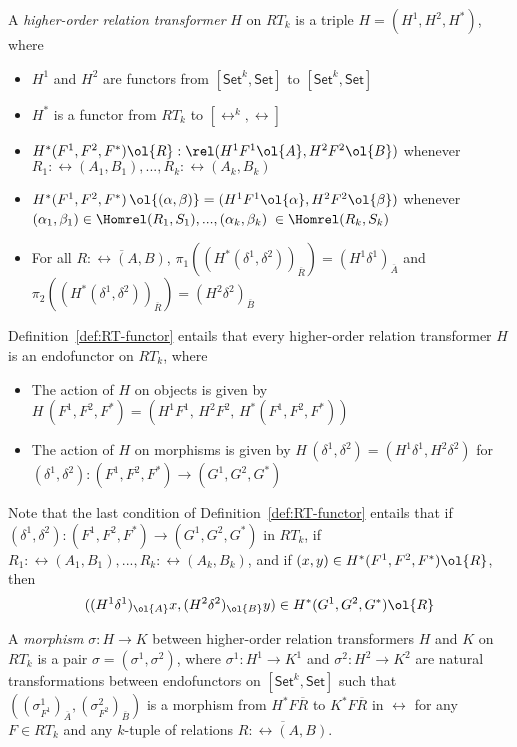 \documentclass{lmcs}
\theoremstyle{plain}\newtheorem{satz}[thm]{Satz}
\newcommand{\set}{\mathsf{Set}}
\begin{document}
\begin{defi}\label{def:RT-functor}
A {\em higher-order relation transformer} $H$ on $RT_k$ is a triple $H
= (H^1,H^2,H^*)$, where
\begin{itemize}
\item $H^1$ and $H^2$ are functors from $[\set^k,\set]$ to $[\set^k,\set]$
\item $H^*$ is a functor from $RT_k$ to $[\rel^k,\rel]$
\item $H^*(F^1,F^2,F^*) \ol{R} : \rel(H^1F^1 \ol{A}, H^2F^2 \ol{B})$
  whenever $R_1:\rel(A_1,B_1),...,R_k:\rel(A_k,B_k)$
\item $H^*(F^1,F^2,F^*)\, \ol{(\alpha, \beta)} = (H^1F^1\ol{\alpha},
  H^2F^2 \ol{\beta})$ whenever $(\alpha_1, \beta_1) \in
  \Homrel(R_1,S_1),..., (\alpha_k, \beta_k)$ $\in \Homrel(R_k,S_k)$
\item For all $\overline{R : \rel(A,B)}$,
  $\pi_1((H^*(\delta^1,\delta^2))_{\overline{R}}) = (H^1
  \delta^1)_{\overline{A}}$ and
  $\pi_2((H^*(\delta^1,\delta^2))_{\overline{R}}) = (H^2
  \delta^2)_{\overline{B}}$
\end{itemize}
\end{defi}
\noindent
Definition~\ref{def:RT-functor} entails that every higher-order
relation transformer $H$ is an endofunctor on $RT_k$, where
\begin{itemize}
\item The action of $H$ on objects is given by $H\,(F^1,F^2,F^*) =
  (H^1F^1,\,H^2F^2,\,H^*(F^1,F^2,F^*))$
\item The action of $H$ on morphisms is given by
  $H\,(\delta^1,\delta^2) = (H^1\delta^1,H^2\delta^2)$ for
  $(\delta^1,\delta^2) : (F^1,F^2,F^*)\to (G^1,G^2,G^*)$
\end{itemize}  
Note that the last condition of Definition~\ref{def:RT-functor}
entails that if $(\delta^1,\delta^2) : (F^1,F^2,F^*)\to (G^1,G^2,G^*)$
in $RT_k$, if $R_1:\rel(A_1,B_1),...,R_k:\rel(A_k,B_k)$, and if $(x,
y) \in H^*(F^1,F^2,F^*)\ol{R}$, then
\[((H^1\delta^1)_{\ol{A}}x, (H^2\delta^2)_{\ol{B}}y) \in
H^*(G^1,G^2,G^*)\ol{R}\] 

\begin{defi}\label{def:RT-nat-trans}
A {\em morphism} $\sigma : H \to K$ between higher-order relation
transformers $H$ and $K$ on $RT_k$ is a pair $\sigma = (\sigma^1,
\sigma^2)$, where $\sigma^1 : H^1 \to K^1$ and $\sigma^2 : H^2 \to
K^2$ are natural transformations between endofunctors on
$[\set^k,\set]$ such that $((\sigma^1_{F^1})_{\overline{A}},
(\sigma^2_{F^2})_{\overline{B}})$ is a morphism from $H^*
F\overline{R}$ to $K^* F\overline{R}$ in $\rel$ for any $F \in RT_k$
and any $k$-tuple of relations $\overline{R : \rel(A, B)}$.
\end{defi}
\end{document}
